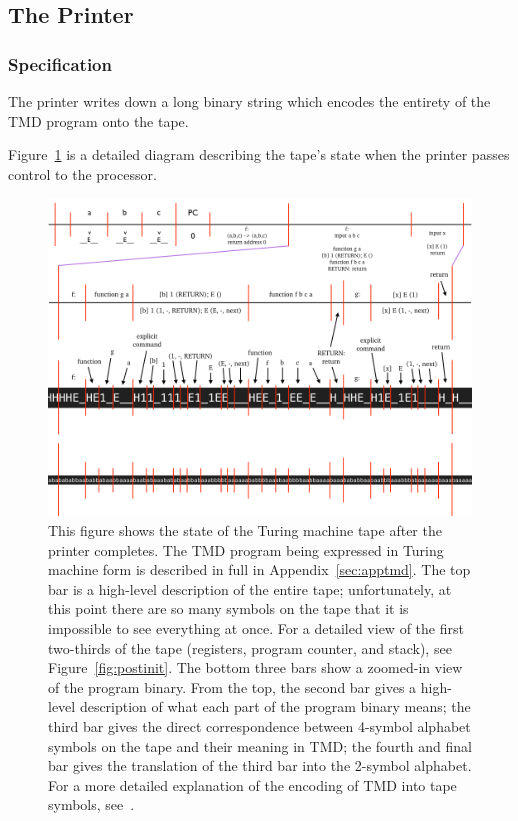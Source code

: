 \documentclass[11pt]{article}
\begin{document}
\subsection{The Printer}

\subsubsection{Specification}

The printer writes down a long binary string which encodes the entirety of the TMD program onto the tape.

Figure~\ref{fig:postprog} is a detailed diagram describing the tape's state when the printer passes control to the processor.

\begin{figure}
\begin{center}
\includegraphics[scale=0.42]{figs/postprog.png}
\caption{This figure shows the state of the Turing machine tape after the printer completes. The TMD program being expressed in Turing machine form is described in full in Appendix~\ref{sec:apptmd}. The top bar is a high-level description of the entire tape; unfortunately, at this point there are so many symbols on the tape that it is impossible to see everything at once. For a detailed view of the first two-thirds of the tape (registers, program counter, and stack), see Figure~\ref{fig:postinit}. The bottom three bars show a zoomed-in view of the program binary. From the top, the second bar gives a high-level description of what each part of the program binary means; the third bar gives the direct correspondence between 4-symbol alphabet symbols on the tape and their meaning in TMD; the fourth and final bar gives the translation of the third bar into the 2-symbol alphabet. For a more detailed explanation of the encoding of TMD into tape symbols, see~\cite{github}. \label{fig:postprog}}
\end{center}
\end{figure}
\end{document}

